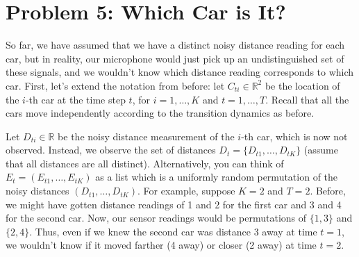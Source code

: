 \documentclass[10pt]{article}
\begin{document}
\begin{enumerate}[label=(\alph*)]
  \begin{center}
	\end{center}

\end{enumerate}
\iffalse
\section*{\normalsize Problem 5: Which Car is It?}

So far, we have assumed that we have a distinct noisy distance reading for each car, but in reality, our microphone would just pick up an undistinguished set of these signals, and we wouldn't know which distance reading corresponds to which car. First, let's extend the notation from before: let $C_{ti} \in \mathbb{R}^2$ be the location of the $i$-th car at the time step $t$, for $i = 1, \dots, K$ and $t = 1, \dots, T$. Recall that all the cars move independently according to the transition dynamics as before.
\smallskip 

Let $D_{ti} \in \mathbb{R}$ be the noisy distance measurement of the $i$-th car, which is now not observed. Instead, we observe the set of distances $D_t = \{D_{t1}, \dots, D_{tK}\}$ (assume that all distances are all distinct). Alternatively, you can think of $E_t = (E_{t1}, \dots, E_{tK})$ as a list which is a uniformly random permutation of the noisy distances $(D_{t1}, \dots, D_{tK})$. For example, suppose $K = 2$ and $T = 2$. Before, we might have gotten distance readings of 1 and 2 for the first car and 3 and 4 for the second car. Now, our sensor readings would be permutations of $\{1, 3\}$ and $\{2 ,4\}$. Thus, even if we knew the second car was distance 3 away at time $t = 1$, we wouldn't know if it moved farther (4 away) or closer (2 away) at time $t = 2$.
\end{document}
